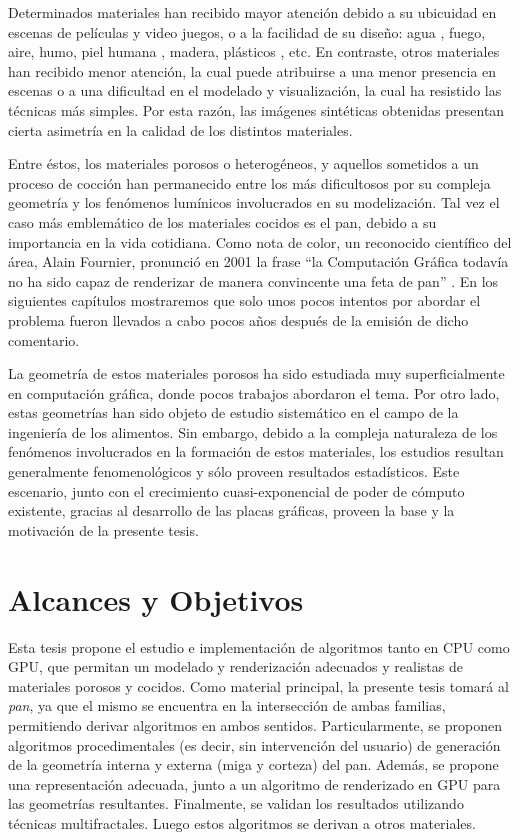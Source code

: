 Determinados materiales han recibido mayor atención debido a su ubicuidad en escenas de películas y video juegos, o a la facilidad de su diseño: agua \cite{Schechter2012}, fuego, aire, humo, piel humana \cite{Donner2006}, madera, plásticos \cite{Kurt2010}, etc.
En contraste, otros materiales han recibido menor atención, la cual puede atribuirse a una menor presencia en escenas o a una dificultad en el modelado y visualización, la cual ha resistido las técnicas más simples.
Por esta razón, las imágenes sintéticas obtenidas presentan cierta asimetría en la calidad de los distintos materiales.

Entre éstos, los materiales porosos o heterogéneos, y aquellos sometidos a un proceso de cocción han permanecido entre los más dificultosos por su compleja geometría y los fenómenos lumínicos involucrados en su modelización.
Tal vez el caso más emblemático de los materiales cocidos es el pan, debido a su importancia en la vida cotidiana.
Como nota de color, un reconocido  científico del área, Alain Fournier, pronunció en 2001 la frase ``la Computación Gráfica todavía no ha sido capaz de renderizar de manera convincente una feta de pan'' \cite{Fiume2001}.
En los siguientes capítulos mostraremos que solo unos pocos intentos por abordar el problema fueron llevados a cabo pocos años después de la emisión de dicho comentario.

La geometría de estos materiales porosos ha sido estudiada muy superficialmente en computación gráfica, donde pocos trabajos abordaron el tema.
Por otro lado, estas geometrías han sido objeto de estudio sistemático en el campo de la ingeniería de los alimentos.
Sin embargo, debido a la compleja naturaleza de los fenómenos involucrados en la formación de estos materiales, los estudios resultan generalmente fenomenológicos y sólo proveen resultados estadísticos.
Este escenario, junto con el crecimiento cuasi-exponencial de poder de cómputo existente, gracias al desarrollo de las placas gráficas, proveen la base y la motivación de la presente tesis.

\section{Alcances y Objetivos}
Esta tesis propone el estudio e implementación de algoritmos tanto en CPU como GPU, que permitan un modelado y renderización adecuados y realistas de materiales porosos y cocidos.
Como material principal, la presente tesis tomará al {\em pan}, ya que el mismo se encuentra en la intersección de ambas familias, permitiendo derivar algoritmos en ambos sentidos.
Particularmente, se proponen algoritmos procedimentales (es decir, sin intervención del usuario) de generación de la geometría interna y externa (miga y corteza) del pan.
Además, se propone una representación adecuada, junto a un algoritmo de renderizado en GPU para las geometrías resultantes.
Finalmente, se validan los resultados utilizando técnicas multifractales.
Luego estos algoritmos se derivan a otros materiales.

